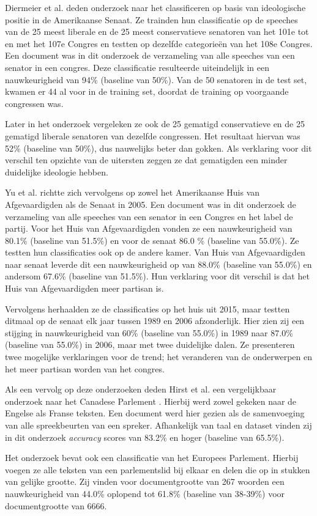 Diermeier et al. deden onderzoek naar het classificeren op basis van ideologische positie in de Amerikaanse Senaat\cite{diermeier_godbout_yu_kaufmann_2012}. Ze trainden hun classificatie op de speeches van de 25 meest liberale en de 25 meest conservatieve senatoren van het 101e tot en met het 107e Congres en testten op dezelfde categorieën van het 108e Congres. Een document was in dit onderzoek de verzameling van alle speeches van een senator in een congres. Deze classificatie resulteerde uiteindelijk in een nauwkeurigheid van 94\% (baseline van 50\%). Van de 50 senatoren in de test set, kwamen er 44 al voor in de training set, doordat de training op voorgaande congressen was.\par
Later in het onderzoek vergeleken ze ook de 25 gematigd conservatieve  en de 25 gematigd liberale senatoren van dezelfde congressen. Het resultaat hiervan was 52\% (baseline van 50\%), dus nauwelijks beter dan gokken. Als verklaring voor dit verschil ten opzichte van de uitersten zeggen ze dat gematigden een minder duidelijke ideologie hebben.\par
Yu et al. \cite{doi:10.1080/19331680802149608} richtte zich vervolgens op zowel het Amerikaanse Huis van Afgevaardigden als de Senaat in 2005. Een document was in dit onderzoek de verzameling van alle speeches van een senator in een Congres en het label de partij. Voor het Huis van Afgevaardigden vonden ze een nauwkeurigheid van 80.1\% (baseline van 51.5\%) en voor de senaat 86.0 \% (baseline van 55.0\%). Ze testten hun classificaties ook op de andere kamer. Van Huis van Afgevaardigden naar senaat leverde dit een nauwkeurigheid op van 88.0\% (baseline van 55.0\%) en andersom 67.6\% (baseline van 51.5\%). Hun verklaring voor dit verschil is dat het Huis van Afgevaardigden meer partisan is.\par
Vervolgens herhaalden ze de classificaties op het huis uit 2015, maar testten ditmaal op de senaat elk jaar tussen 1989 en 2006 afzonderlijk. Hier zien zij een stijging in nauwkeurigheid van 60\% (baseline van 55.0\%) in 1989 naar 87.0\% (baseline van 55.0\%) in 2006, maar met twee duidelijke dalen. Ze presenteren twee mogelijke verklaringen voor de trend; het veranderen van de onderwerpen en het meer partisan worden van het congres. \par
Als een vervolg op deze onderzoeken deden Hirst et al. een vergelijkbaar onderzoek naar het Canadese Parlement \cite{Hirst_textto}. Hierbij werd zowel gekeken naar de Engelse als Franse teksten. Een document werd hier gezien als de samenvoeging van alle spreekbeurten van een spreker. Afhankelijk van taal en dataset vinden zij in dit onderzoek \textit{accuracy} scores van 83.2\%  en hoger (baseline van 65.5\%).\par
Het onderzoek bevat ook een classificatie van het Europees Parlement. Hierbij voegen ze alle teksten van een parlementslid bij elkaar en delen die op in stukken van gelijke grootte. Zij vinden voor documentgrootte van 267 woorden een nauwkeurigheid van 44.0\% oplopend tot 61.8\% (baseline van 38-39\%) voor documentgrootte van 6666.\par

